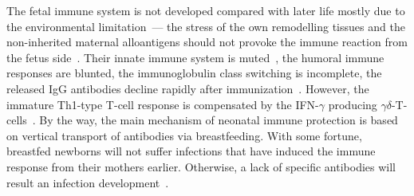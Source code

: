 The fetal immune system is not developed compared with later life mostly due to the environmental limitation~---
the stress of the own remodelling tissues and the non-inherited maternal alloantigens should not provoke
the immune reaction from the fetus side~\cite{Simon2015}.
Their innate immune system is muted~\cite{Haase2010}, the humoral immune responses are blunted,
the immunoglobulin class switching is incomplete, the released IgG antibodies decline rapidly after
immunization~\cite{Pihlgren2006}.
However, the immature Th1-type T-cell response is compensated by the IFN-$\gamma$ producing
$\gamma\delta$-T-cells~\cite{Gibbons2009}.
By the way, the main mechanism of neonatal immune protection is based on vertical transport of antibodies
via breastfeeding.
With some fortune, breastfed newborns will not suffer infections that have induced the immune response
from their mothers earlier.
Otherwise, a lack of specific antibodies will result an infection development~\cite{Dias2017}.
